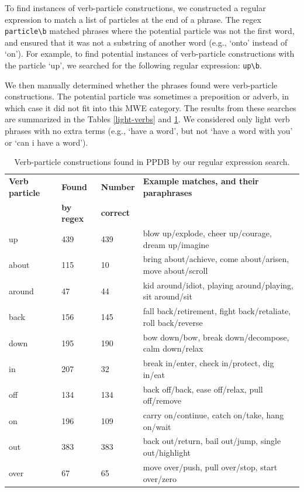 \documentclass[11pt]{article}
\begin{document}
To find instances of verb-particle constructions, we constructed a regular expression to match a list of particles at the end of a phrase. The regex {\tt particle\textbackslash b} matched phrases where the potential particle was not the first word, and ensured that it was not a substring of another word (e.g., `onto' instead of `on'). For example, to find potential instances of verb-particle constructions with the particle `up', we searched for the following regular expression: {\tt up\textbackslash b}.

We then manually determined  whether the phrases found were verb-particle constructions. The potential particle was sometimes a preposition or adverb, in which case it did not fit into this MWE category. 
The results from these searches are summarized in the Tables \ref{light-verbs} and \ref{verb-particle}. We considered only light verb phrases with no extra terms (e.g., `have a word', but not `have a word with you' or `can i have a word').


\begin{table}
\begin{center}
\begin{tabular}{|l|l|l|p{.5\linewidth}|}
\hline \bf Verb particle & \bf Found  & \bf Number  & \bf Example matches, and their paraphrases\\ 
 & \bf   by regex & \bf correct & \\ \hline
up & 439 & 439 & blow up/explode, cheer up/courage, dream up/imagine\\
about & 115 & 10 & bring about/achieve, come about/arisen, move about/scroll\\
around & 47 & 44 & kid around/idiot, playing around/playing, sit around/sit\\
back & 156 & 145 & fall back/retirement, fight back/retaliate, roll back/reverse\\
down & 195 & 190 & bow down/bow, break down/decompose, calm down/relax\\
in & 207 & 32 & break in/enter, check in/protect, dig in/eat\\
off & 134 & 134 & back off/back, ease off/relax, pull off/remove\\
on & 196 & 109 & carry on/continue, catch on/take, hang on/wait\\
out & 383 & 383 & back out/return, bail out/jump, single out/highlight\\
over & 67 & 65 & move over/push, pull over/stop, start over/zero\\
\hline
\end{tabular}
\end{center}
\caption{\label{verb-particle} Verb-particle constructions found in PPDB by our regular expression search. }
\end{table}
\end{document}
